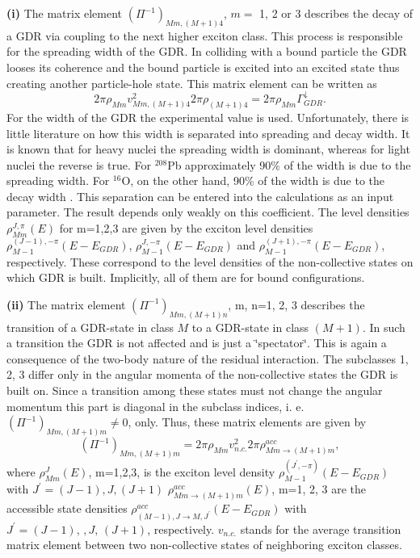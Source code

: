 \documentclass[twocolumn,amsmath,amssymb,10pt,groupedaddress,a4paper]{revtex4}
\begin{document}
\smallskip
\textbf{(i)} The matrix element $(\Pi^{-1})_{Mm,(M+1)4}$, $m=$ 1,
2 or 3 describes the decay of a GDR via coupling to the next higher
exciton class. This process is responsible for the spreading width
of the GDR. In colliding with a bound particle the GDR looses its
coherence and the bound particle is excited into an excited state
thus creating another particle-hole state. This matrix element can
be written as \begin{equation}
2\pi\rho_{Mm}v_{Mm,(M+1)4}^{2}2\pi\rho_{(M+1)4}=2\pi\rho_{Mm}\Gamma_{GDR}^{\downarrow}.\end{equation}
For the width of the GDR the experimental value is used. Unfortunately,
there is little literature on how this width is separated into spreading
and decay width. It is known that for heavy nuclei the spreading width
is dominant, whereas for light nuclei the reverse is true. For $^{208}$Pb
approximately 90\% of the width is due to the spreading width. For
$^{16}$O, on the other hand, 90\% of the width is due to the decay
width \cite{BBB83}. This separation can be entered into the calculations
as an input parameter. The result depends only weakly on this coefficient.
The level densities $\rho_{Mm}^{J,\pi}(E)$
for m=1,2,3 are given by the exciton level densities $\rho_{M-1}^{(J-1),-\pi}(E-E_{GDR})$,
$\rho_{M-1}^{J,-\pi}(E-E_{GDR})$ and $\rho_{M-1}^{(J+1),-\pi}(E-E_{GDR})$,
respectively. These correspond to the level densities of the non-collective
states on which GDR is built. Implicitly, all of them are for bound
configurations.

\smallskip
\textbf{(ii)} The matrix element $(\Pi^{-1})_{Mm,(M+1)n}$, m, n=1,
2, 3 describes the transition of a GDR-state in class $M$ to a GDR-state
in class $(M+1)$. In such a transition the GDR is not affected and
is just a \char`\"{}spectator\char`\"{}. This is again a consequence
of the two-body nature of the residual interaction. The subclasses
1, 2, 3 differ only in the angular momenta of the non-collective states
the GDR is built on. Since a transition among these states must not
change the angular momentum this part is diagonal in the subclass
indices, i. e. $(\Pi^{-1})_{Mm,(M+1)m}\not=0$, only. Thus, these
matrix elements are given by \begin{equation}
(\Pi^{-1})_{Mm,(M+1)m}=2\pi\rho_{Mm}v_{n.c.}^{2}2\pi\rho_{Mm\rightarrow(M+1)m}^{acc},\end{equation}
where $\rho_{Mm}^{J}(E)$, m=1,2,3, is the exciton level density
$\rho_{M-1}^{(J^{\prime},-\pi)}(E-E_{GDR})$ with $J^{\prime}=(J-1),J,(J+1)$
$\rho_{Mm\rightarrow(M+1)m}^{acc}(E)$, m=1, 2, 3 are the accessible
state densities $\rho_{(M-1),J\rightarrow M,J^{\prime}}^{acc}(E-E_{GDR})$
with $J^{\prime}=(J-1),\,,J,\,(J+1)$, respectively. $v_{n.c.}$ stands
for the average transition matrix element between two non-collective
states of neighboring exciton classes.
\end{document}
